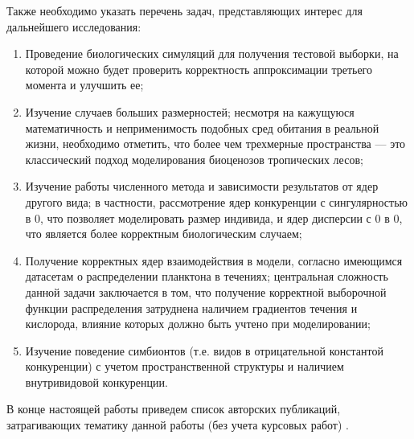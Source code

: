 Также необходимо указать перечень задач, представляющих интерес для дальнейшего исследования:
\begin{enumerate}
	
\item Проведение биологических симуляций для получения тестовой выборки, на которой можно будет проверить корректность аппроксимации третьего момента и улучшить ее;

\item  Изучение случаев больших размерностей; несмотря на кажущуюся математичность и неприменимость подобных сред обитания в реальной жизни, необходимо отметить, что более чем трехмерные пространства — это классический подход моделирования биоценозов тропических лесов;

\item Изучение работы численного метода и зависимости результатов от ядер другого вида; в частности, рассмотрение ядер конкуренции с сингулярностью в 0, что позволяет моделировать размер индивида, и ядер дисперсии с 0 в 0, что является более корректным биологическим случаем;

\item Получение корректных ядер взаимодействия в модели, согласно имеющимся датасетам о распределении планктона в течениях; центральная сложность данной задачи заключается в том, что получение корректной выборочной функции распределения затруднена наличием градиентов течения и кислорода, влияние которых должно быть учтено при моделировании;

\item Изучение поведение симбионтов (т.е. видов в отрицательной константой конкуренции) с учетом пространственной структуры и наличием внутривидовой конкуренции.

\end{enumerate}

В конце настоящей работы приведем список авторских публикаций, затрагивающих тематику данной работы (без учета курсовых работ) .